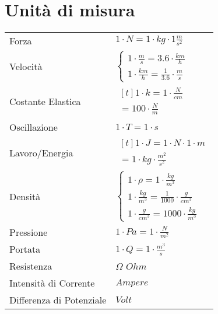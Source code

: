\section{Unità di misura}
\begin{center}
  \begin{tabularx}{\textwidth}{ l l }
    Forza                    & $1 \cdot N = 1 \cdot kg \cdot 1 \frac{m}{s^2}$ \\
    Velocità                 & $\begin{cases}
        1 \cdot \frac{m}{s} = 3.6 \cdot \frac{km}{h} \\
        1 \cdot \frac{km}{h} = \frac{1}{3.6} \cdot \frac{m}{s}
      \end{cases}$                    \\
    Costante Elastica        & $\!\begin{aligned}[t]1 \cdot k = 1 \cdot \frac{N}{cm} \\ = 100 \cdot \frac{N}{m}\end{aligned}$                  \\
    Oscillazione             & $1 \cdot T = 1 \cdot s$                        \\
    Lavoro/Energia           & $\!\begin{aligned}[t]1 \cdot J = 1 \cdot N \cdot 1 \cdot m \\ = 1 \cdot kg \cdot \frac{m^2}{s^2} \end{aligned}$                  \\
    Densità                  & $\begin{cases}
        1 \cdot \rho = 1 \cdot \frac{kg}{m^3}                        \\
        1 \cdot \frac{kg}{m^3} = \frac{1}{1000} \cdot \frac{g}{cm^3} \\
        1 \cdot \frac{g}{cm^3} = 1000 \cdot \frac{kg}{m^3}
      \end{cases}$                    \\
    Pressione                & $1 \cdot Pa = 1 \cdot \frac{N}{m^2}$           \\
    Portata                  & $1 \cdot Q = 1 \cdot \frac{m^3}{s}$            \\
    Resistenza               & $\Omega$ $Ohm$                                 \\
    Intensità di Corrente    & $Ampere$                                       \\
    Differenza di Potenziale & $Volt$
  \end{tabularx}
\end{center}
